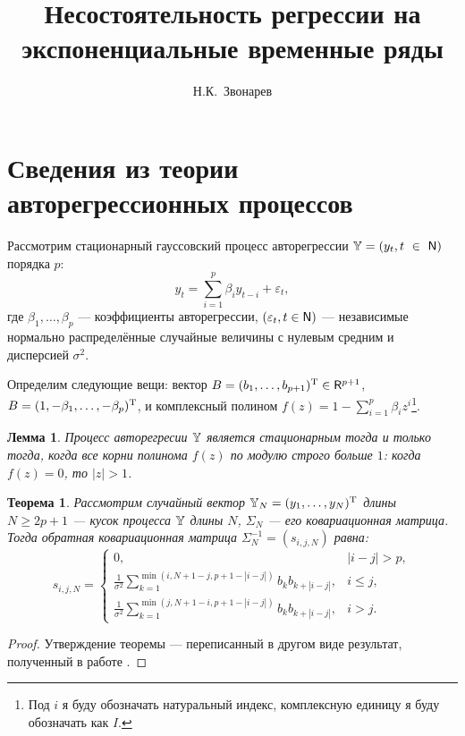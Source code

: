 \documentclass[12pt,a4paper]{article}
\newtheorem{theorem}{Теорема}
\newtheorem{lemma}{Лемма}
\begin{document}
\title{Несостоятельность регрессии на экспоненциальные временные ряды}
\author{Н.К.~Звонарев}



\maketitle

\section{Сведения из теории авторегрессионных процессов}

Рассмотрим стационарный гауссовский процесс авторегрессии $\mathbb{Y} = (y_t, t~\in~\mathsf{N})$ порядка $p$:
\begin{equation} \label{def:arp}
y_t = \sum_{i = 1}^p \beta_i y_{t - i} + \varepsilon_t,
\end{equation}
где $\beta_1, \ldots, \beta_p$ --- коэффициенты авторегрессии, $(\varepsilon_t, t \in \mathsf{N})$ --- независимые нормально распределённые случайные величины с нулевым средним и дисперсией $\sigma^2$.

Определим следующие вещи: вектор $B = (b_1, \ldots, b_{p+1})^{\mathrm{T}} \in \mathsf{R}^{p+1}$, $B = (1, -\beta_1, \ldots, -\beta_p)^{\mathrm{T}}$, и комплексный полином $f(z) = 1 - \sum_{i=1}^p \beta_i z^i$\footnote{Под $i$ я буду обозначать натуральный индекс, комплексную единицу я буду обозначать как $I$.}.

\begin{lemma}\label{th:stat}
	Процесс авторегресии $\mathbb{Y}$ является стационарным тогда и только тогда, когда все корни полинома $f(z)$ по модулю строго больше $1$: когда $f(z) = 0$, то $|z| > 1$.
\end{lemma}

\begin{theorem}\label{th:invcov}
	Рассмотрим случайный вектор $\mathbb{Y}_N = (y_1, \ldots, y_N)^{\mathrm{T}}$ длины $N \ge 2p + 1$ --- кусок процесса $\mathbb{Y}$ длины $N$, $\Sigma_N$ --- его ковариационная матрица. Тогда обратная ковариационная матрица $\Sigma_N^{-1} = (s_{i, j, N})$ равна:
	\begin{equation*}
	s_{i, j, N} = \begin{cases}
	0, & |i - j| > p, \\
	\frac{1}{\sigma^2}\sum_{k = 1}^{\min(i, N + 1 - j, p + 1 - |i - j|)}b_k b_{k + |i - j|}, & i \le j, \\
	\frac{1}{\sigma^2}\sum_{k = 1}^{\min(j, N + 1 - i, p + 1 - |i - j|)}b_k b_{k + |i - j|}, & i > j.
	\end{cases}
	\end{equation*}
\end{theorem}
\begin{proof}
	Утверждение теоремы --- переписанный в другом виде результат, полученный в работе \cite{Verbyla1985}.
\end{proof}
\end{document}
